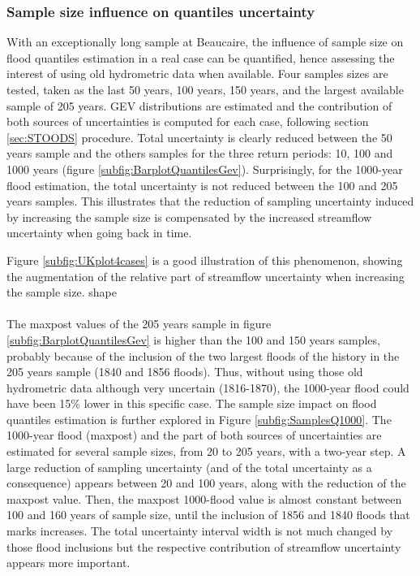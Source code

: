 \documentclass[11pt]{article}
\begin{document}
        \subsubsection{Sample size influence on quantiles uncertainty}
        
        With an exceptionally long sample at Beaucaire, the influence of sample size on flood quantiles estimation in a real case can be quantified, hence assessing the interest of using old hydrometric data when available. Four samples sizes are tested, taken as the last 50 years, 100 years, 150 years, and the largest available sample of 205 years. GEV distributions are estimated and the contribution of both sources of uncertainties is computed for each case, following section \ref{sec:STOODS} procedure.
        Total uncertainty is clearly reduced between the 50 years sample and the others samples for the three return periods: 10, 100 and 1000 years (figure \ref{subfig:BarplotQuantilesGev}). Surprisingly, for the 1000-year flood estimation, the total uncertainty is not reduced between the 100 and 205 years samples. This illustrates that the reduction of sampling uncertainty induced by increasing the sample size is compensated by the increased streamflow uncertainty when going back in time. 
        
        Figure \ref{subfig:UKplot4cases} is a good illustration of this phenomenon, showing the augmentation of the relative part of streamflow uncertainty when increasing the sample size. shape
        \paragraph{}
        The maxpost values of the 205 years sample in figure \ref{subfig:BarplotQuantilesGev} is higher than the 100 and 150 years samples, probably because of the inclusion of the two largest floods of the history in the 205 years sample (1840 and 1856 floods). Thus, without using those old hydrometric data although very uncertain (1816-1870), the 1000-year flood could have been 15\% lower in this specific case. The sample size impact on flood quantiles estimation is further explored in Figure \ref{subfig:SamplesQ1000}. The 1000-year flood (maxpost) and the part of both sources of uncertainties are estimated for several sample sizes, from 20 to 205 years, with a two-year step. A large reduction of sampling uncertainty (and of the total uncertainty as a consequence) appears between 20 and 100 years, along with the reduction of the maxpost value. Then, the maxpost 1000-flood value is almost constant between 100 and 160 years of sample size, until the inclusion of 1856 and 1840 floods that marks increases. The total uncertainty interval width is not much changed by those flood inclusions but the respective contribution of streamflow uncertainty appears more important.  
        
\end{document}
